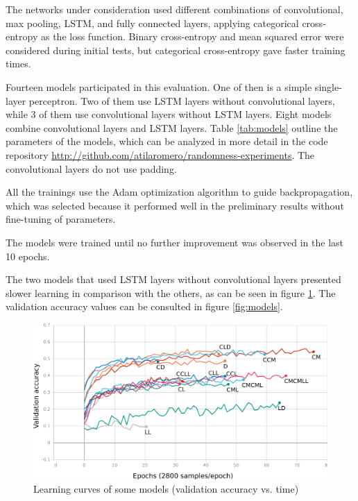 The networks under consideration used different combinations of convolutional, max pooling, LSTM, and fully connected layers,
applying categorical cross-entropy as the loss function. Binary cross-entropy and mean squared error were considered during initial tests, but categorical cross-entropy gave faster training times.

Fourteen models participated in this evaluation. One of then is a simple single-layer perceptron. Two of them use LSTM layers without convolutional layers, while 3 of them use convolutional layers without LSTM layers. Eight models combine convolutional layers and LSTM layers. Table \ref{tab:models} outline the parameters of the models, which can be analyzed in more detail in the code repository \sloppy\url{http://github.com/atilaromero/randomness-experiments}. The convolutional layers do not use padding. 



All the trainings use the Adam \cite{kingma_adam:_2014}
optimization algorithm to guide backpropagation, which was selected because it performed well in the preliminary results without fine-tuning of parameters.

The models were trained until no further improvement was observed in the last 10 epochs.

The two models that used LSTM layers without convolutional layers presented slower learning in comparison with the others, as can be seen in figure \ref{fig:learning}. The validation accuracy values can be consulted in figure \ref{fig:models}.

\noindent
\begin{figure}[htb!]
\centering\includegraphics[width=1.0\textwidth]{content/epoch_val_categorical_accuracy.png}
\caption{\label{fig:learning}Learning curves of some models (validation accuracy vs. time)}%
\end{figure}

